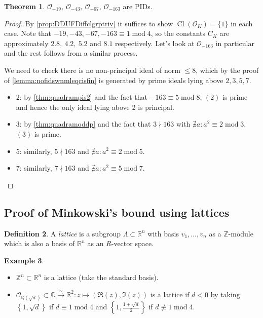 \documentclass{article}
\newcommand{\Z}{\mathbb{Z}}
\newcommand{\Q}{\mathbb{Q}}
\newcommand{\R}{\mathbb{R}}
\newcommand{\C}{\mathbb{C}}
\newcommand{\Mod}{\operatorname{mod}}
\newcommand{\Cl}{\operatorname{Cl}}
\newcommand{\ri}{\mathcal{O}}
\theoremstyle{definition}
\newtheorem{defn}{Definition}[subsection]
\newtheorem{thm}[defn]{Theorem}
\newtheorem{example}[defn]{Example}
\begin{document}
\begin{thm}
$\ri_{-19},\ \ri_{-43},\ \ri_{-67},\ \ri_{-163}$ are PIDs.
\end{thm}
\begin{proof}
By \ref{prop:DDUFDiffclgrptriv} it suffices to show $\Cl(\ri_K)=\{1\}$ in each case. Note that $-19,-43,-67,-163\equiv 1\Mod 4$, so the constants $C_K$ are approximately $2.8,\ 4.2,\ 5.2$ and $8.1$ respectively. Let's look at $\ri_{-163}$ in particular and the rest follows from a similar process.

We need to check there is no non-principal ideal of norm $\leq 8$, which by the proof of \ref{lemma:nofidswnmleqcisfin} is generated by prime ideals lying above $2,3,5,7$.
\begin{itemize}
\item 2: by \ref{thm:quadrampis2} and the fact that $-163\equiv 5\Mod 8$, $(2)$ is prime and hence the only ideal lying above 2 is principal.
\item 3: by \ref{thm:quadramoddp} and the fact that $3\nmid 163$ with $\nexists a:a^2\equiv 2\Mod 3$, $(3)$ is prime.
\item 5: similarly, $5\nmid 163$ and $\nexists a:a^2\equiv 2\Mod 5$.
\item 7: similarly, $7\nmid 163$ and $\nexists a:a^2\equiv 5\Mod 7$.
\end{itemize}
\end{proof}

\subsection{Proof of Minkowski's bound using lattices}
\begin{defn}
A \textit{lattice} is a subgroup $\Lambda\subset\R^n$ with basis $v_1,\ldots,v_n$ as a $\Z$-module which is also a basis of $\R^n$ as an $R$-vector space.
\end{defn}
\begin{example}
\label{example:lattices}
\begin{itemize}
\item $\Z^n\subset\R^n$ is a lattice (take the standard basis).
\item $\ri_{\Q\left(\sqrt d\right)}\subset\C\xrightarrow{\sim}\R^2:z\mapsto(\Re(z),\Im(z))$ is a lattice if $d<0$ by taking $\left\{1,\sqrt d\right\}$ if $d\equiv 1\Mod 4$ and $\left\{1,\frac{1+\sqrt d}{2}\right\}$ if $d\not\equiv 1\Mod 4$.
\end{itemize}
\end{example}
\end{document}
